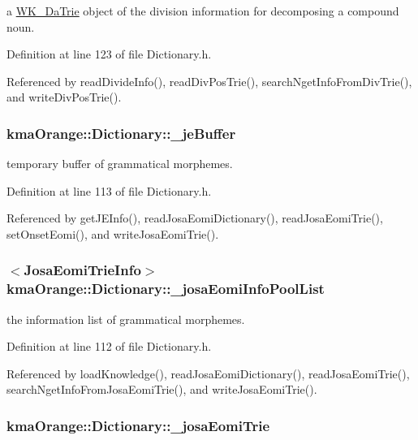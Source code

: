 a \hyperlink{classkmaOrange_1_1WK__DaTrie}{WK\_\-DaTrie} object of the division information for decomposing a compound noun. 



Definition at line 123 of file Dictionary.h.

Referenced by readDivideInfo(), readDivPosTrie(), searchNgetInfoFromDivTrie(), and writeDivPosTrie().\hypertarget{classkmaOrange_1_1Dictionary_5de2ba7c4ee80c48f7d060a4d4fdff78}{
\subsubsection[{\_\-jeBuffer}]{ {\bf kmaOrange::Dictionary::\_\-jeBuffer}}}
\label{classkmaOrange_1_1Dictionary_5de2ba7c4ee80c48f7d060a4d4fdff78}


temporary buffer of grammatical morphemes. 



Definition at line 113 of file Dictionary.h.

Referenced by getJEInfo(), readJosaEomiDictionary(), readJosaEomiTrie(), setOnsetEomi(), and writeJosaEomiTrie().\hypertarget{classkmaOrange_1_1Dictionary_b9784b60c4c70b298bca88ab0857075b}{
\subsubsection[{\_\-josaEomiInfoPoolList}]{$<${\bf JosaEomiTrieInfo}$>$ {\bf kmaOrange::Dictionary::\_\-josaEomiInfoPoolList}}}
\label{classkmaOrange_1_1Dictionary_b9784b60c4c70b298bca88ab0857075b}


the information list of grammatical morphemes. 



Definition at line 112 of file Dictionary.h.

Referenced by loadKnowledge(), readJosaEomiDictionary(), readJosaEomiTrie(), searchNgetInfoFromJosaEomiTrie(), and writeJosaEomiTrie().\hypertarget{classkmaOrange_1_1Dictionary_580a2bff4df42be6211a7695c77c3a41}{
\subsubsection[{\_\-josaEomiTrie}]{ {\bf kmaOrange::Dictionary::\_\-josaEomiTrie}}}
\label{classkmaOrange_1_1Dictionary_580a2bff4df42be6211a7695c77c3a41}


